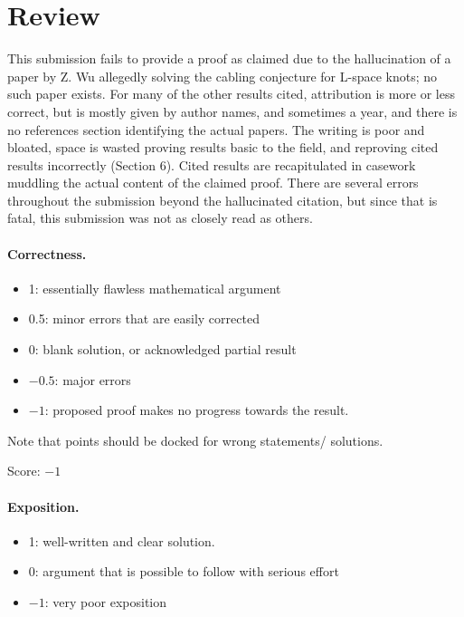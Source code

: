 \documentclass[11pt]{article}
\theoremstyle{definition}
\theoremstyle{remark}
\begin{document}
\maketitle

\section{Review}

This submission fails to provide a proof as claimed due to the hallucination of a paper by Z. Wu allegedly solving the cabling conjecture for L-space knots; no such paper exists. For many of the other results cited, attribution is more or less correct, but is mostly given by author names, and sometimes a year, and there is no references section identifying the actual papers. The writing is poor and bloated, space is wasted proving results basic to the field, and reproving cited results incorrectly (Section 6). Cited results are recapitulated in casework muddling the actual content of the claimed proof. There are several errors throughout the submission beyond the hallucinated citation, but since that is fatal, this submission was not as closely read as others.


\paragraph{Correctness.}
\begin{itemize}
	\item  1: essentially flawless mathematical argument
	\item  0.5: minor errors that are easily corrected
	\item  0: blank solution, or acknowledged partial result
	\item  $-0.5$: major errors
	\item  $-1$: proposed proof makes no progress towards the result.
\end{itemize}
Note that points should be docked for wrong statements/ solutions.

\noindent Score: $-1$

\paragraph{Exposition.}
\begin{itemize}
	\item  1: well-written and clear solution.
	\item  0: argument that is possible to follow with serious effort
	\item  $-1$: very poor exposition
\end{itemize}
\end{document}
